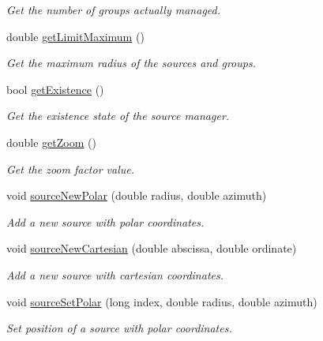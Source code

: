 \begin{DoxyCompactItemize}
\begin{DoxyCompactList}\small\item\em Get the number of groups actually managed. \end{DoxyCompactList}\item 
double \hyperlink{class_hoa2_d_1_1_sources_manager_a8fa568c1e2b10ec9340bfc52126ef814}{get\-Limit\-Maximum} ()
\begin{DoxyCompactList}\small\item\em Get the maximum radius of the sources and groups. \end{DoxyCompactList}\item 
bool \hyperlink{class_hoa2_d_1_1_sources_manager_a5ad91b38fe4d1118c930f0fd4e58c10a}{get\-Existence} ()
\begin{DoxyCompactList}\small\item\em Get the existence state of the source manager. \end{DoxyCompactList}\item 
double \hyperlink{class_hoa2_d_1_1_sources_manager_a538dcdcc1279e0e1bc56d0b7d03857c6}{get\-Zoom} ()
\begin{DoxyCompactList}\small\item\em Get the zoom factor value. \end{DoxyCompactList}\item 
void \hyperlink{class_hoa2_d_1_1_sources_manager_ace3215e4a6e4242b04fe09797ebffd60}{source\-New\-Polar} (double radius, double azimuth)
\begin{DoxyCompactList}\small\item\em Add a new source with polar coordinates. \end{DoxyCompactList}\item 
void \hyperlink{class_hoa2_d_1_1_sources_manager_ae184e5906bb22f564723ba881887fbeb}{source\-New\-Cartesian} (double abscissa, double ordinate)
\begin{DoxyCompactList}\small\item\em Add a new source with cartesian coordinates. \end{DoxyCompactList}\item 
void \hyperlink{class_hoa2_d_1_1_sources_manager_a2bc5099b130c9eb390f1a36de59ca714}{source\-Set\-Polar} (long index, double radius, double azimuth)
\begin{DoxyCompactList}\small\item\em Set position of a source with polar coordinates. \end{DoxyCompactList}\item 

\end{DoxyCompactItemize}
